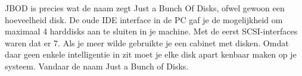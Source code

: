 JBOD is precies wat de naam zegt Just a Bunch Of Disks, ofwel gewoon een hoeveelheid disk. De oude IDE interface in de PC gaf je de mogelijkheid om maximaal 4 harddisks aan te sluiten in je machine. Met de eerst SCSI-interfaces waren dat er 7. Als je meer wilde gebruikte je een cabinet met disken. Omdat daar geen enkele intelligentie in zit moet je elke disk apart kenbaar maken op je systeem. Vandaar de naam Just a Bunch of Disks.
